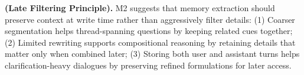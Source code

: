 
\begin{findingbox}
\textbf{(Late Filtering Principle).}
M2 suggests that memory extraction should preserve context at write time rather than aggressively filter details: 
(1) Coarser segmentation helps thread-spanning questions by keeping related cues together;
(2) Limited rewriting supports compositional reasoning by retaining details that matter only when combined later;
(3) Storing both user and assistant turns helps clarification-heavy dialogues by preserving refined formulations for later access.
\end{findingbox}

